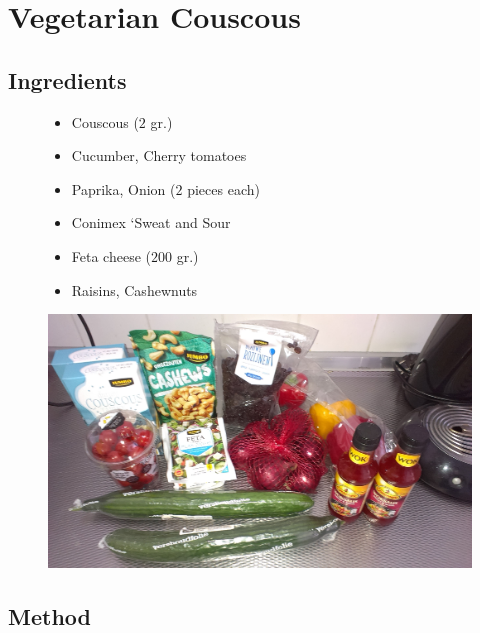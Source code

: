 \documentclass[a4paper,12pt]{report}
\begin{document}
\chapter{Vegetarian Couscous}


\section*{Ingredients}
\begin{figure}[h]

\begin{minipage}{0.65\textwidth}
\begin{itemize}
\item Couscous ($2$ gr.)
\item Cucumber, Cherry tomatoes 
\item Paprika, Onion ($2$ pieces each)
\item Conimex `Sweat and Sour
\item Feta cheese ($200$ gr.)
\item Raisins, Cashewnuts
\end{itemize}
\end{minipage}
\begin{minipage}{0.3\textwidth}
	\includegraphics[scale=0.07]{Images/cous.jpg}
\end{minipage}
\end{figure}


\section*{Method}
\end{document}
